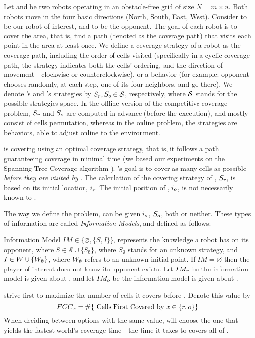 Let \rob and \opp be two robots operating in an obstacle-free grid \w of size $N=m \times n$. Both robots move in the four basic directions (North, South, East, West). Consider \rob to be our robot-of-interest, and \opp to be the opponent. 
The goal of each robot is to cover the area, that is, find a path (denoted as the coverage path) that visits  each point in the area at least once. We define a coverage strategy of a robot as the coverage path, including the order of cells visited (specifically in a cyclic coverage path, the strategy indicates both the cells' ordering, and the direction of movement---clockwise or counterclockwise), or a behavior (for example: opponent chooses randomly, at each step, one of its four neighbors, and go there). We denote \rob's and \opp's strategies by $S_r,S_o\in \mathcal{S}$, respectively, where $\cal{S}$ stands for the possible strategies space. In the offline version of the competitive coverage problem, $S_r$ and $S_o$ are computed in advance (before the execution), and mostly consist of cells permutation, whereas in the online problem, the strategies are behaviors, able to adjust online to the environment.

\opp is covering \w using an optimal coverage strategy, that is, it follows a path guaranteeing coverage in minimal time (we based our experiments on the Spanning-Tree Coverage algorithm \cite{gabriely2001spanning}). \rob's goal is to cover as many cells as possible {\em before they are visited by \rob}. The calculation of the covering strategy of \rob, $S_r$, is based on its initial location, $i_r$. The initial position of \opp, $i_o$, is not necessarily known to \rob.

The way we define the problem, \rob can be given $i_o$, $S_o$, both or neither. These types of information are called {\em Information Models}, and defined as follows:
\begin{definition}
Information Model $IM \in \lbrace \varnothing, \lbrace S,I\rbrace \rbrace$, represents the knowledge a robot has on its opponent, where $S\in \mathcal{S} \cup \lbrace S_\emptyset \rbrace$, where $S_\emptyset$ stands for an unknown strategy, and $I \in W \cup \lbrace W_\emptyset \rbrace$, where $W_{\emptyset}$ refers to an unknown initial point.
If $IM=\varnothing$ then the player of interest does not know its opponent exists.
Let $IM_r$ be the information model \rob is given about \opp, and let $IM_o$ be the information model \opp is given about \rob.
\end{definition}
\rob strive first to maximize the number of cells it covers before \opp. Denote this value by 
\begin{dmath*}[compact]
\fcc_{x}= 
\# \lbrace \textnormal{ Cells First Covered by } x \in \lbrace\rob,\opp\rbrace \rbrace 
\end{dmath*}
When deciding between options with the same \fcc value, \rob will choose the one that yields the fastest world's coverage time - the time it takes \rob to covers all of \w.

